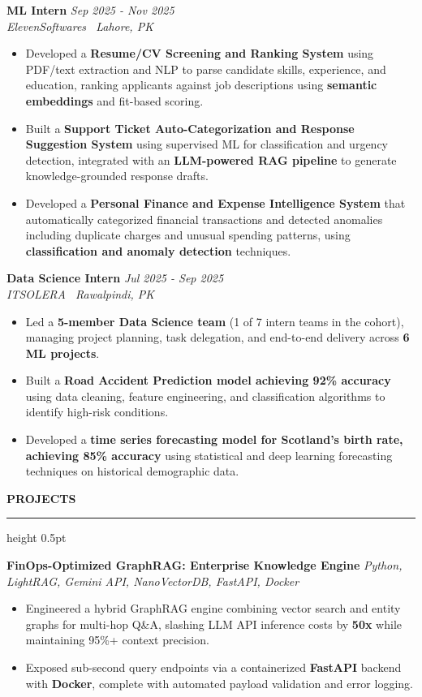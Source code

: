 \documentclass[10pt,letterpaper]{article}
\newcommand{\resumesection}[1]{%
  \vspace{3.0pt}%
  {\fontsize{10pt}{11.5pt}\selectfont\textbf{\MakeUppercase{#1}}}%
  \vspace{1.0pt}%
  \hrule height 0.5pt%
  \vspace{2.0pt}%
}
\begin{document}
\vspace{1.5pt}
\noindent\textbf{ML Intern} \hfill \textit{Sep 2025 - Nov 2025} \\
\textit{ElevenSoftwares \textbar\ Lahore, PK}
\begin{itemize}
  \item Developed a \textbf{Resume/CV Screening and Ranking System} using PDF/text extraction and NLP to parse candidate skills, experience, and education, ranking applicants against job descriptions using \textbf{semantic embeddings} and fit-based scoring.
  \item Built a \textbf{Support Ticket Auto-Categorization and Response Suggestion System} using supervised ML for classification and urgency detection, integrated with an \textbf{LLM-powered RAG pipeline} to generate knowledge-grounded response drafts.
  \item Developed a \textbf{Personal Finance and Expense Intelligence System} that automatically categorized financial transactions and detected anomalies including duplicate charges and unusual spending patterns, using \textbf{classification and anomaly detection} techniques.
\end{itemize}

\vspace{1.5pt}
\noindent\textbf{Data Science Intern} \hfill \textit{Jul 2025 - Sep 2025} \\
\textit{ITSOLERA \textbar\ Rawalpindi, PK}
\begin{itemize}
  \item Led a \textbf{5-member Data Science team} (1 of 7 intern teams in the cohort), managing project planning, task delegation, and end-to-end delivery across \textbf{6 ML projects}.
  \item Built a \textbf{Road Accident Prediction model achieving 92\% accuracy} using data cleaning, feature engineering, and classification algorithms to identify high-risk conditions.
  \item Developed a \textbf{time series forecasting model for Scotland's birth rate, achieving 85\% accuracy} using statistical and deep learning forecasting techniques on historical demographic data.
\end{itemize}

\resumesection{Projects}
\noindent\textbf{FinOps-Optimized GraphRAG: Enterprise Knowledge Engine} \hfill \textit{Python, LightRAG, Gemini API, NanoVectorDB, FastAPI, Docker}
\begin{itemize}
  \item Engineered a hybrid GraphRAG engine combining vector search and entity graphs for multi-hop Q\&A, slashing LLM API inference costs by \textbf{50x} while maintaining 95\%+ context precision.
  \item Exposed sub-second query endpoints via a containerized \textbf{FastAPI} backend with \textbf{Docker}, complete with automated payload validation and error logging.
\end{itemize}
\end{document}
